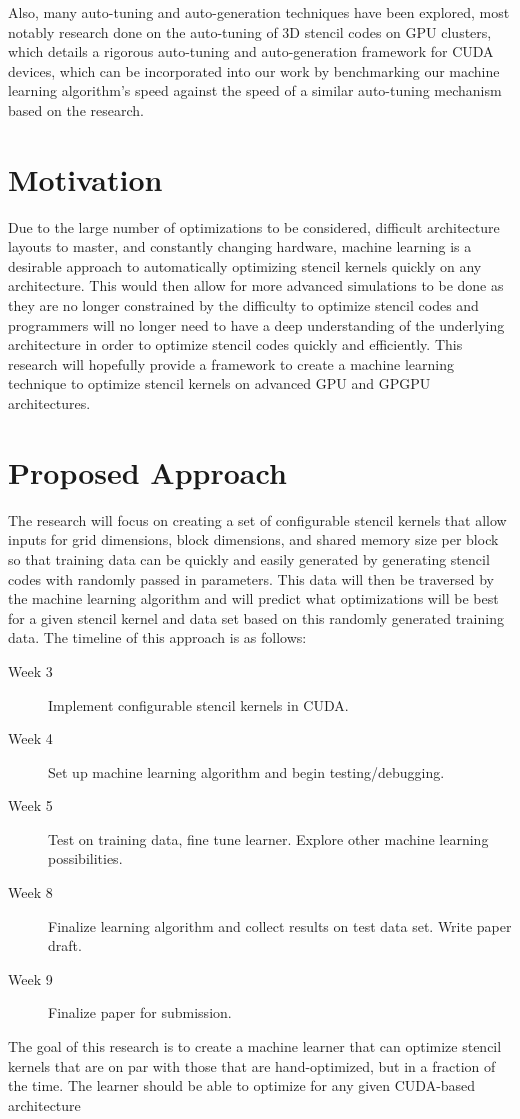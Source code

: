\documentclass[conference]{IEEEtran}
\begin{document}
Also, many auto-tuning and auto-generation techniques have been explored, most notably research done on the auto-tuning of 3D stencil codes on GPU clusters, which details a rigorous auto-tuning and auto-generation framework for CUDA devices, which can be incorporated into our work by benchmarking our machine learning algorithm's speed against the speed of a similar auto-tuning mechanism based on the research\cite{Zhang}. 

\section{Motivation}
Due to the large number of optimizations to be considered, difficult architecture layouts to master, and constantly changing hardware, machine learning is a desirable approach to automatically optimizing stencil kernels quickly on any architecture. This would then allow for more advanced simulations to be done as they are no longer constrained by the difficulty to optimize stencil codes and programmers will no longer need to have a deep understanding of the underlying architecture in order to optimize stencil codes quickly and efficiently. This research will hopefully provide a framework to create a machine learning technique to optimize stencil kernels on advanced GPU and GPGPU architectures.

\section{Proposed Approach}
The research will focus on creating a set of configurable stencil kernels that allow inputs for grid dimensions, block dimensions, and shared memory size per block so that training data can be quickly and easily generated by generating stencil codes with randomly passed in parameters. This data will then be traversed by the machine learning algorithm and will predict what optimizations will be best for a given stencil kernel and data set based on this randomly generated training data. The timeline of this approach is as follows:
\begin{description}
   \item[Week 3] {Implement configurable stencil kernels in CUDA.}
   \item[Week 4] {Set up machine learning algorithm and begin testing/debugging.}
   \item[Week 5] {Test on training data, fine tune learner. Explore other machine learning possibilities.} 
   \item[Week 8] {Finalize learning algorithm and collect results on test data set. Write paper draft.}
   \item[Week 9] {Finalize paper for submission.}
\end{description}
The goal of this research is to create a machine learner that can optimize stencil kernels that are on par with those that are hand-optimized, but in a fraction of the time. The learner should be able to optimize for any given CUDA-based architecture 
\end{document}
